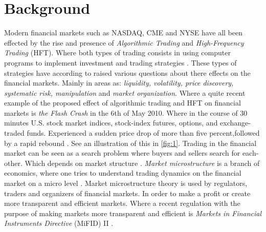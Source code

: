 \documentclass{kththesis}
\theoremstyle{definition}
\begin{document}
\section{Background}
Modern financial markets such as NASDAQ, CME and NYSE have all been effected by the rise and presence of \textit{Algorithmic Trading} and \textit{High-Frequency Trading} (HFT).  Where both types of trading consists in using computer programs to implement investment and trading strategies \parencite{abergel2012market}. These types of strategies have according to \textcite{abergel2012market, o2015high} raised various questions about there effects on the financial markets. Mainly in areas as: \textit{liquidity, volatility, price discovery, systematic risk, manipulation} and \textit{market organization}. Where a quite recent example of the proposed effect of algorithmic trading and HFT on financial markets is \textit{the Flash Crash} in the 6th of May 2010. Where in the course of 30 minutes U.S. stock market indices, stock-index futures, options, and exchange-traded funds. Experienced a sudden price drop of more than five percent,followed by a rapid rebound \parencite{kirilenko2011flash,kirilenko2017flash}. See an illustration of this in \autoref{fig:1}.
\newline
\newline
Trading in the financial market can be seen as a search problem where buyers and sellers search for each-other. Which depends on market structure \parencite{abergel2012market}. \textit{Market microstructure} is a branch of economics, where one tries to understand trading dynamics on the financial market on a micro level \parencite{o1995market, hasbrouck2007empirical}. Market microstructure theory is used by regulators, traders and organizers of financial markets. In order to make a profit or create more transparent and efficient markets. Where a recent regulation with the purpose of making markets more transparent and efficient is \textit{Markets in Financial Instruments Directive} (MiFID) II \parencite{busch2016mifid}.
\end{document}

